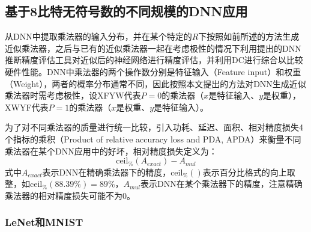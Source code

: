 \subsection{基于8比特无符号数的不同规模的DNN应用}

从DNN中提取乘法器的输入分布，并在某个特定的$R$下按照如前所述的方法生成近似乘法器，之后与已有的近似乘法器一起在考虑极性的情况下利用提出的DNN推断精度评估工具对近似后的神经网络进行精度评估，并利用DC进行综合以比较硬件性能。DNN中乘法器的两个操作数分别是特征输入（Feature input）和权重（Weight），两者的概率分布通常不同，因此按照本文提出的方法对DNN生成近似乘法器时需考虑极性，设XFYW代表$P=0$的乘法器（$x$是特征输入、$y$是权重），XWYF代表$P=1$的乘法器（$x$是权重、$y$是特征输入）。

为了对不同乘法器的质量进行统一比较，引入功耗、延迟、面积、相对精度损失4个指标的乘积（Product of relative accuracy loss and PDA, APDA）来衡量不同乘法器在某个DNN应用中的好坏，相对精度损失定义为：
\begin{equation}
     \text{ceil}_\% ( A_{exact} ) - A_{mul}
\label{AC:AM:Adapt:LeNet:Eq:accuracy_loss}
\end{equation}
式中$A_{exact}$表示DNN在精确乘法器下的精度，$\text{ceil}_\%()$表示百分比格式的向上取整，如$\text{ceil}_\%(88.39\%) = 89\% $，$A_{mul}$表示DNN在某个乘法器下的精度，注意精确乘法器的相对精度损失可能不为0。

\subsubsection{LeNet和MNIST}

